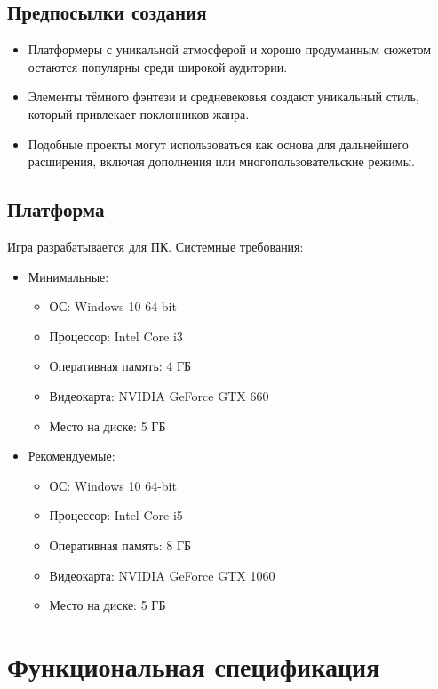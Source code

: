 \documentclass{article}
\begin{document}
\subsection{Предпосылки создания}
\begin{itemize}
    \item Платформеры с уникальной атмосферой и хорошо продуманным сюжетом остаются популярны среди широкой аудитории.
    \item Элементы тёмного фэнтези и средневековья создают уникальный стиль, который привлекает поклонников жанра.
    \item Подобные проекты могут использоваться как основа для дальнейшего расширения, включая дополнения или многопользовательские режимы.
\end{itemize}

\subsection{Платформа}
Игра разрабатывается для ПК. Системные требования:
\begin{itemize}
    \item Минимальные:
    \begin{itemize}
        \item ОС: Windows 10 64-bit
        \item Процессор: Intel Core i3
        \item Оперативная память: 4 ГБ
        \item Видеокарта: NVIDIA GeForce GTX 660
        \item Место на диске: 5 ГБ
    \end{itemize}
    \item Рекомендуемые:
    \begin{itemize}
        \item ОС: Windows 10 64-bit
        \item Процессор: Intel Core i5
        \item Оперативная память: 8 ГБ
        \item Видеокарта: NVIDIA GeForce GTX 1060
        \item Место на диске: 5 ГБ
    \end{itemize}
\end{itemize}

\section{Функциональная спецификация}
\end{document}
